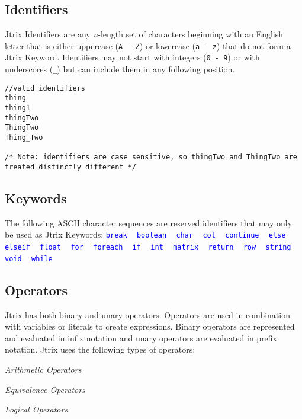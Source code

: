 \documentclass[12pt]{report}
\begin{document}
\subsection{Identifiers}
Jtrix Identifiers are any \textit{n}-length set of characters beginning with an English letter that is either uppercase (\texttt{A - Z}) or lowercase (\texttt{a - z}) that do not form a Jtrix Keyword. Identifiers may not start with integers (\texttt{0 - 9}) or with underscores (\texttt{\_}) but can include them in any following position.
\begin{lstlisting}
//valid identifiers
thing
thing1
thingTwo
ThingTwo
Thing_Two

/* Note: identifiers are case sensitive, so thingTwo and ThingTwo are treated distinctly different */
\end{lstlisting}

\subsection{Keywords}
The following ASCII character sequences are reserved identifiers that may only be used as Jtrix Keywords:
 \textcolor{blue}{\texttt{break}}		
~	  \textcolor{blue}{\texttt{boolean}}		
~	  \textcolor{blue}{\texttt{char}}	
~	  \textcolor{blue}{\texttt{col}}	
~	  \textcolor{blue}{\texttt{continue}}	
~	  \textcolor{blue}{\texttt{else}}	 
~	 \textcolor{blue}{\texttt{elseif}}	
~	  \textcolor{blue}{\texttt{float}}	
~	 \textcolor{blue}{\texttt{for}}	
~	 \textcolor{blue}{\texttt{foreach}}	
~	  \textcolor{blue}{\texttt{if}}	
~	  \textcolor{blue}{\texttt{int}}	
~	  \textcolor{blue}{\texttt{matrix}}	
~	  \textcolor{blue}{\texttt{return}}	
~	 \textcolor{blue}{\texttt{row}}	
~	  \textcolor{blue}{\texttt{string}}	
~	 \textcolor{blue}{\texttt{void}}	
~	  \textcolor{blue}{\texttt{while}}	

\subsection{Operators}
Jtrix has both binary and unary operators. Operators are used in combination with variables or literals to create expressions. Binary operators are represented and evaluated in infix notation and unary operators are evaluated in prefix notation. Jtrix uses the following types of operators:

 \textit{Arithmetic Operators}

 \textit{Equivalence Operators}

 \textit{Logical Operators}
\end{document}
